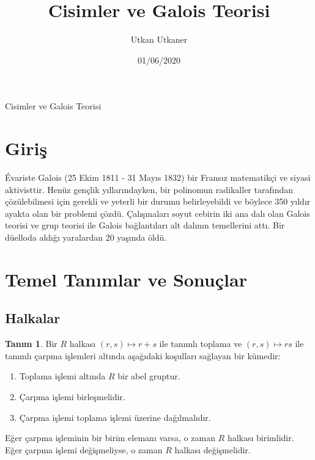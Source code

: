 \documentclass[draft]{article}
\title{Cisimler ve Galois Teorisi}
\author{Utkan Utkaner}
\date{01/06/2020}
\theoremstyle{definition}
\newtheorem{defn}{Tanım}[section]
\theoremstyle{remark}
\begin{document}
    \maketitle
	
	\newpage
	
	\renewcommand{\contentsname}{İçindekiler}
	\tableofcontents
	
	\newpage
	
	{Cisimler ve Galois Teorisi}
	\renewcommand{\sectionmark}[1]{}
	
	\section{Giriş}
	
	    Évariste Galois (25 Ekim 1811 - 31 Mayıs 1832) bir Fransız matematikçi ve siyasi aktivisttir. Henüz gençlik yıllarındayken, bir polinomun radikaller tarafından çözülebilmesi için gerekli ve yeterli bir durumu belirleyebildi ve böylece 350 yıldır ayakta olan bir problemi çözdü. Çalışmaları soyut cebirin iki ana dalı olan Galois teorisi ve grup teorisi ile Galois bağlantıları alt dalının temellerini attı. Bir düelloda aldığı yaralardan 20 yaşında öldü.
	
	\section{Temel Tanımlar ve Sonuçlar}
	
	    \subsection{Halkalar}
	
    	    \begin{defn}
    	        Bir $R$ halkası $(r, s) \mapsto r + s$ ile tanımlı toplama ve $(r, s) \mapsto rs$ ile tanımlı çarpma işlemleri altında aşağıdaki koşulları sağlayan bir kümedir:
    	        \begin{enumerate}
        	    \renewcommand{\labelenumi}{(\roman{enumi})}
        			\item Toplama işlemi altında $R$ bir abel gruptur.
        			\item Çarpma işlemi birleşmelidir.
        			\item Çarpma işlemi toplama işlemi üzerine dağılmalıdır.
        		\end{enumerate}
        		Eğer çarpma işleminin bir birim elemanı varsa, o zaman $R$ halkası birimlidir.
        		Eğer çarpma işlemi değişmeliyse, o zaman $R$ halkası değişmelidir.
        	\end{defn}
        	
\end{document}
